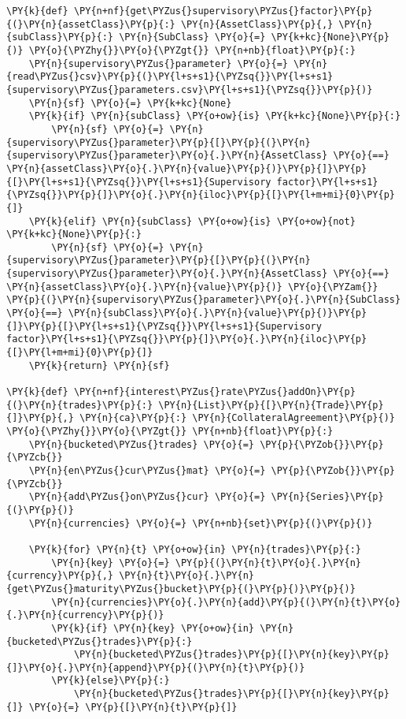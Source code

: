     \begin{tcolorbox}[breakable, size=fbox, boxrule=1pt, pad at break*=1mm,colback=cellbackground, colframe=cellborder]
\begin{Verbatim}[commandchars=\\\{\}]
\PY{k}{def} \PY{n+nf}{get\PYZus{}supervisory\PYZus{}factor}\PY{p}{(}\PY{n}{assetClass}\PY{p}{:} \PY{n}{AssetClass}\PY{p}{,} \PY{n}{subClass}\PY{p}{:} \PY{n}{SubClass} \PY{o}{=} \PY{k+kc}{None}\PY{p}{)} \PY{o}{\PYZhy{}}\PY{o}{\PYZgt{}} \PY{n+nb}{float}\PY{p}{:}
    \PY{n}{supervisory\PYZus{}parameter} \PY{o}{=} \PY{n}{read\PYZus{}csv}\PY{p}{(}\PY{l+s+s1}{\PYZsq{}}\PY{l+s+s1}{supervisory\PYZus{}parameters.csv}\PY{l+s+s1}{\PYZsq{}}\PY{p}{)}
    \PY{n}{sf} \PY{o}{=} \PY{k+kc}{None}
    \PY{k}{if} \PY{n}{subClass} \PY{o+ow}{is} \PY{k+kc}{None}\PY{p}{:}
        \PY{n}{sf} \PY{o}{=} \PY{n}{supervisory\PYZus{}parameter}\PY{p}{[}\PY{p}{(}\PY{n}{supervisory\PYZus{}parameter}\PY{o}{.}\PY{n}{AssetClass} \PY{o}{==} \PY{n}{assetClass}\PY{o}{.}\PY{n}{value}\PY{p}{)}\PY{p}{]}\PY{p}{[}\PY{l+s+s1}{\PYZsq{}}\PY{l+s+s1}{Supervisory factor}\PY{l+s+s1}{\PYZsq{}}\PY{p}{]}\PY{o}{.}\PY{n}{iloc}\PY{p}{[}\PY{l+m+mi}{0}\PY{p}{]}
    \PY{k}{elif} \PY{n}{subClass} \PY{o+ow}{is} \PY{o+ow}{not} \PY{k+kc}{None}\PY{p}{:}
        \PY{n}{sf} \PY{o}{=} \PY{n}{supervisory\PYZus{}parameter}\PY{p}{[}\PY{p}{(}\PY{n}{supervisory\PYZus{}parameter}\PY{o}{.}\PY{n}{AssetClass} \PY{o}{==} \PY{n}{assetClass}\PY{o}{.}\PY{n}{value}\PY{p}{)} \PY{o}{\PYZam{}} \PY{p}{(}\PY{n}{supervisory\PYZus{}parameter}\PY{o}{.}\PY{n}{SubClass} \PY{o}{==} \PY{n}{subClass}\PY{o}{.}\PY{n}{value}\PY{p}{)}\PY{p}{]}\PY{p}{[}\PY{l+s+s1}{\PYZsq{}}\PY{l+s+s1}{Supervisory factor}\PY{l+s+s1}{\PYZsq{}}\PY{p}{]}\PY{o}{.}\PY{n}{iloc}\PY{p}{[}\PY{l+m+mi}{0}\PY{p}{]}
    \PY{k}{return} \PY{n}{sf}

\PY{k}{def} \PY{n+nf}{interest\PYZus{}rate\PYZus{}addOn}\PY{p}{(}\PY{n}{trades}\PY{p}{:} \PY{n}{List}\PY{p}{[}\PY{n}{Trade}\PY{p}{]}\PY{p}{,} \PY{n}{ca}\PY{p}{:} \PY{n}{CollateralAgreement}\PY{p}{)} \PY{o}{\PYZhy{}}\PY{o}{\PYZgt{}} \PY{n+nb}{float}\PY{p}{:}
    \PY{n}{bucketed\PYZus{}trades} \PY{o}{=} \PY{p}{\PYZob{}}\PY{p}{\PYZcb{}}
    \PY{n}{en\PYZus{}cur\PYZus{}mat} \PY{o}{=} \PY{p}{\PYZob{}}\PY{p}{\PYZcb{}}
    \PY{n}{add\PYZus{}on\PYZus{}cur} \PY{o}{=} \PY{n}{Series}\PY{p}{(}\PY{p}{)}
    \PY{n}{currencies} \PY{o}{=} \PY{n+nb}{set}\PY{p}{(}\PY{p}{)}
    
    \PY{k}{for} \PY{n}{t} \PY{o+ow}{in} \PY{n}{trades}\PY{p}{:}
        \PY{n}{key} \PY{o}{=} \PY{p}{(}\PY{n}{t}\PY{o}{.}\PY{n}{currency}\PY{p}{,} \PY{n}{t}\PY{o}{.}\PY{n}{get\PYZus{}maturity\PYZus{}bucket}\PY{p}{(}\PY{p}{)}\PY{p}{)}
        \PY{n}{currencies}\PY{o}{.}\PY{n}{add}\PY{p}{(}\PY{n}{t}\PY{o}{.}\PY{n}{currency}\PY{p}{)}
        \PY{k}{if} \PY{n}{key} \PY{o+ow}{in} \PY{n}{bucketed\PYZus{}trades}\PY{p}{:}
            \PY{n}{bucketed\PYZus{}trades}\PY{p}{[}\PY{n}{key}\PY{p}{]}\PY{o}{.}\PY{n}{append}\PY{p}{(}\PY{n}{t}\PY{p}{)}
        \PY{k}{else}\PY{p}{:}
            \PY{n}{bucketed\PYZus{}trades}\PY{p}{[}\PY{n}{key}\PY{p}{]} \PY{o}{=} \PY{p}{[}\PY{n}{t}\PY{p}{]}
    

\end{Verbatim}
\end{tcolorbox}
